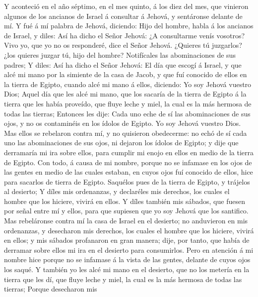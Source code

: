  Y aconteció en el año séptimo, en el mes quinto, á los
diez del mes, que vinieron algunos de los ancianos de Israel á consultar
á Jehová, y sentáronse delante de mí.  Y fué á mí palabra
de Jehová, diciendo:  Hijo del hombre, habla á los
ancianos de Israel, y diles: Así ha dicho el Señor Jehová: ¿A
consultarme venís vosotros? Vivo yo, que yo no os responderé, dice el
Señor Jehová.  ¿Quieres tú juzgarlos? ¿los quieres juzgar
tú, hijo del hombre? Notifícales las abominaciones de sus padres;
 Y diles: Así ha dicho el Señor Jehová: El día que escogí
á Israel, y que alcé mi mano por la simiente de la casa de Jacob, y que
fuí conocido de ellos en la tierra de Egipto, cuando alcé mi mano á
ellos, diciendo: Yo soy Jehová vuestro Dios;  Aquel día
que les alcé mi mano, que los sacaría de la tierra de Egipto á la tierra
que les había proveído, que fluye leche y miel, la cual es la más
hermosa de todas las tierras;  Entonces les dije: Cada uno
eche de sí las abominaciones de sus ojos, y no os contaminéis en los
ídolos de Egipto. Yo soy Jehová vuestro Dios.  Mas ellos
se rebelaron contra mí, y no quisieron obedecerme: no echó de sí cada
uno las abominaciones de sus ojos, ni dejaron los ídolos de Egipto; y
dije que derramaría mi ira sobre ellos, para cumplir mi enojo en ellos
en medio de la tierra de Egipto.  Con todo, á causa de mi
nombre, porque no se infamase en los ojos de las gentes en medio de las
cuales estaban, en cuyos ojos fuí conocido de ellos, hice para sacarlos
de tierra de Egipto.  Saquélos pues de la tierra de
Egipto, y trájelos al desierto;  Y díles mis ordenanzas,
y declaréles mis derechos, los cuales el hombre que los hiciere, vivirá
en ellos.  Y díles también mis sábados, que fuesen por
señal entre mí y ellos, para que supiesen que yo soy Jehová que los
santifico.  Mas rebeláronse contra mí la casa de Israel
en el desierto; no anduvieron en mis ordenanzas, y desecharon mis
derechos, los cuales el hombre que los hiciere, vivirá en ellos; y mis
sábados profanaron en gran manera; dije, por tanto, que había de
derramar sobre ellos mi ira en el desierto para consumirlos.
 Pero en atención á mi nombre hice porque no se infamase
á la vista de las gentes, delante de cuyos ojos los saqué.
 Y también yo les alcé mi mano en el desierto, que no los
metería en la tierra que les dí, que fluye leche y miel, la cual es la
más hermosa de todas las tierras;  Porque desecharon mis
